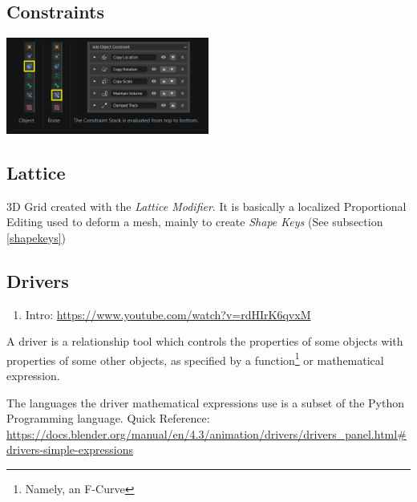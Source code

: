 \documentclass{article}
\begin{document}
\subsection{Constraints}\label{constraints}
\begin{center}
    \includegraphics[width=0.5\textwidth]{blender_docs_images/my_constraint_stack.png}
\end{center}

\subsection{Lattice}
3D Grid created with the \textit{Lattice Modifier}. It is basically a localized Proportional Editing used to deform a mesh, mainly to create \textit{Shape Keys} (See subsection \ref{shapekeys})

\subsection{Drivers}
\begin{enumerate}[noitemsep, topsep=0pt]
    \item Intro: \href{https://www.youtube.com/watch?v=rdHIrK6qvxM}{https://www.youtube.com/watch?v=rdHIrK6qvxM}
\end{enumerate}
A driver is a relationship tool which controls the properties of some objects with properties of some other objects, as specified by a function\footnote{Namely, an F-Curve} or mathematical expression.\par
The languages the driver mathematical expressions use is a subset of the Python Programming language. Quick Reference: \url{https://docs.blender.org/manual/en/4.3/animation/drivers/drivers_panel.html#drivers-simple-expressions}\par
\end{document}
